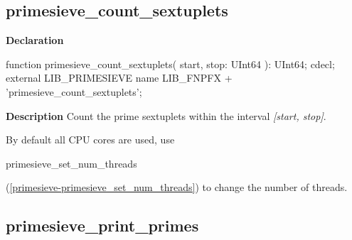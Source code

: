 \documentclass{report}
\newif\ifpdf
\begin{document}
\subsection*{primesieve{\_}count{\_}sextuplets}
\fi
\label{primesieve-primesieve_count_sextuplets}
\begin{list}{}{
\setlength{\itemindent}{0cm}
\setlength{\listparindent}{0cm}
\setlength{\leftmargin}{\evensidemargin}
\addtolength{\leftmargin}{\tmplength}
\settowidth{\labelsep}{X}
\addtolength{\leftmargin}{\labelsep}
\setlength{\labelwidth}{\tmplength}
}
\item[\textbf{Declaration}\hfill]
\ifpdf
\begin{flushleft}
\fi
\begin{ttfamily}
function primesieve{\_}count{\_}sextuplets( start, stop: UInt64 ): UInt64; cdecl; external LIB{\_}PRIMESIEVE name LIB{\_}FNPFX + 'primesieve{\_}count{\_}sextuplets';\end{ttfamily}

\ifpdf
\end{flushleft}
\fi

\par
\item[\textbf{Description}]
Count the prime sextuplets within the interval \textit{[start, stop]}.

By default all CPU cores are used, use \begin{ttfamily}primesieve{\_}set{\_}num{\_}threads\end{ttfamily}(\ref{primesieve-primesieve_set_num_threads}) to change the number of threads.

\end{list}
\ifpdf
\subsection*{\large{\textbf{primesieve{\_}print{\_}primes}}\normalsize\hspace{1ex}\hrulefill}
\else
\end{document}
